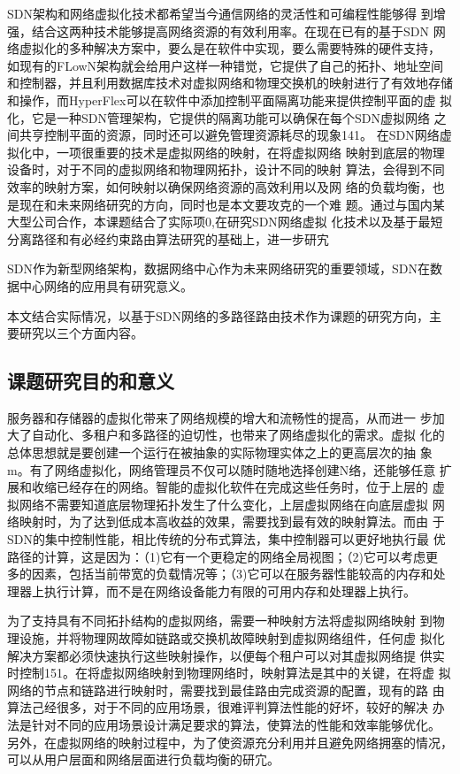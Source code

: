 SDN架构和网络虚拟化技术都希望当今通信网络的灵活性和可编程性能够得 到增强，结合这两种技术能够提高网络资源的有效利用率。在现在已有的基于SDN 网络虚拟化的多种解决方案中，要么是在软件中实现，要么需要特殊的硬件支持， 如现有的FLowN架构就会给用户这样一种错觉，它提供了自己的拓扑、地址空间 和控制器，并且利用数据库技术对虚拟网络和物理交换机的映射进行了有效地存储和操作，而HyperFlex可以在软件中添加控制平面隔离功能来提供控制平面的虚 拟化，它是一种SDN管理架构，它提供的隔离功能可以确保在每个SDN虚拟网络 之间共亨控制平面的资源，同时还可以避免管理资源耗尽的现象141。
在SDN网络虚拟化中，一项很重要的技术是虚拟网络的映射，在将虚拟网络 映射到底层的物理设备时，对于不同的虚拟网络和物理网拓扑，设计不同的映射 算法，会得到不同效率的映射方案，如何映射以确保网络资源的高效利用以及网 络的负载均衡，也是现在和未来网络研究的方向，同时也是本文要攻克的一个难 题。通过与国内某大型公司合作，本课题结合了实际项0,在研究SDN网络虚拟 化技术以及基于最短分离路径和有必经约束路由算法研究的基础上，进一步研宄






SDN作为新型网络架构，数据网络中心作为未来网络研究的重要领域，SDN在数据中心网络的应用具有研究意义。

本文结合实际情况，以基于SDN网络的多路径路由技术作为课题的研究方向，主要研究以三个方面内容。


\subsection{课题研究目的和意义}
服务器和存储器的虚拟化带来了网络规模的增大和流畅性的提高，从而进一 步加大了自动化、多租户和多路径的迫切性，也带来了网络虚拟化的需求。虚拟 化的总体思想就是要创建一个运行在被抽象的实际物理实体之上的更高层次的抽 象m。有了网络虚拟化，网络管理员不仅可以随时随地选择创建N络，还能够任意 扩展和收缩已经存在的网络。智能的虚拟化软件在完成这些任务时，位于上层的 虚拟网络不需要知道底层物理拓扑发生了什么变化，上层虚拟网络在向底层虚拟 网络映射时，为了达到低成本高收益的效果，需要找到最有效的映射算法。而由 于SDN的集中控制性能，相比传统的分布式算法，集中控制器可以更好地执行最 优路径的计算，这是因为：（1)它有一个更稳定的网络全局视图；（2)它可以考虑更 多的因素，包括当前带宽的负载情况等；（3)它可以在服务器性能较高的内存和处 理器上执行计算，而不是在网络设备能力有限的可用内存和处理器上执行。

为了支持具有不同拓扑结构的虚拟网络，需要一种映射方法将虚拟网络映射 到物理设施，并将物理网故障如链路或交换机故障映射到虚拟网络组件，任何虚 拟化解决方案都必须快速执行这些映射操作，以便每个租户可以对其虚拟网络提 供实时控制151。在将虚拟网络映射到物理网络时，映射算法是其中的关键，在将虚 拟网络的节点和链路进行映射时，需要找到最佳路由完成资源的配置，现有的路 由算法己经很多，对于不同的应用场景，很难评判算法性能的好坏，较好的解决 办法是针对不同的应用场景设计满足要求的算法，使算法的性能和效率能够优化。 另外，在虚拟网络的映射过程中，为了使资源充分利用并且避免网络拥塞的情况， 可以从用户层面和网络层面进行负载均衡的研宂。


